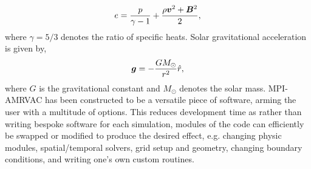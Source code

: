 \begin{equation}
e = \frac{p}{\gamma-1}+ \frac{\rho \boldsymbol{v}^2+\boldsymbol{B}^2}{2},
\end{equation}
where $\gamma=5/3$ denotes the ratio of specific heats. Solar gravitational acceleration is given by,
\begin{equation}
\boldsymbol{g}=-\frac{GM_{\odot}}{r^2}\hat{r},
\end{equation}
where $G$ is the gravitational constant and $M_{\odot}$ denotes the solar mass. \np
%
MPI-AMRVAC has been constructed to be a versatile piece of software, arming the user with a multitude of options. This reduces development time as rather than writing bespoke software for each simulation, modules of the code can efficiently be swapped or modified to produce the desired effect, e.g. changing physic modules, spatial/temporal solvers, grid setup and geometry, changing boundary conditions, and writing one's own custom routines.
